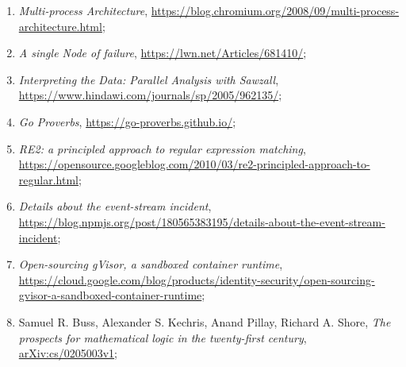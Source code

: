 \documentclass[a4paper,11pt]{article}
\begin{document}
\begin{enumerate}
\item \textit{Multi-process Architecture},
  \href{https://blog.chromium.org/2008/09/multi-process-architecture.html}{https://blog.chromium.org/2008/09/multi-process-architecture.html};



\item \textit{A single Node of failure},
  \href{https://lwn.net/Articles/681410/}{https://lwn.net/Articles/681410/};



\item \textit{Interpreting the Data: Parallel Analysis with Sawzall},
  \href{https://www.hindawi.com/journals/sp/2005/962135/}{https://www.hindawi.com/journals/sp/2005/962135/};



\item \textit{Go Proverbs},
  \href{https://go-proverbs.github.io/}{https://go-proverbs.github.io/};



\item \textit{RE2: a principled approach to regular expression
    matching}, \\
  \href{https://opensource.googleblog.com/2010/03/re2-principled-approach-to-regular.html}{https://opensource.googleblog.com/2010/03/re2-principled-approach-to-regular.html};



\item \textit{Details about the event-stream incident}, \\
  \href{https://blog.npmjs.org/post/180565383195/details-about-the-event-stream-incident}{https://blog.npmjs.org/post/180565383195/details-about-the-event-stream-incident};



\item \textit{Open-sourcing gVisor, a sandboxed container runtime}, \\
  \href{https://cloud.google.com/blog/products/identity-security/open-sourcing-gvisor-a-sandboxed-container-runtime}{https://cloud.google.com/blog/products/identity-security/open-sourcing-gvisor-a-sandboxed-container-runtime};



\item Samuel R. Buss, Alexander S. Kechris, Anand Pillay, Richard A.
  Shore, \textit{The prospects for mathematical logic in the
    twenty-first century},
  \href{https://arxiv.org/abs/cs/0205003v1}{arXiv:cs/0205003v1};




\end{enumerate}
\end{document}
